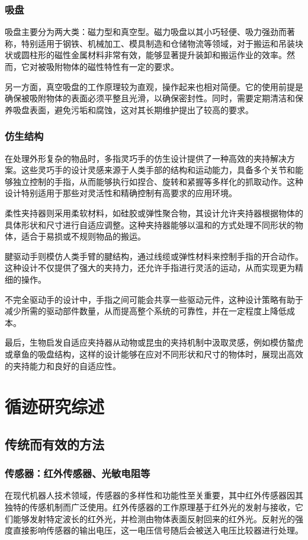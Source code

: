\documentclass{report}
\begin{document}
\newpage
\subsubsection{吸盘}
\label{subsec:label}
吸盘主要分为两大类：磁力型和真空型。磁力吸盘以其小巧轻便、吸力强劲而著称，特别适用于钢铁、机械加工、模具制造和仓储物流等领域，对于搬运和吊装块状或圆柱形的磁性金属材料非常有效，能够显著提升装卸和搬运作业的效率。然而，它对被吸附物体的磁性特性有一定的要求。

另一方面，真空吸盘的工作原理较为直观，操作起来也相对简便。它的使用前提是确保被吸附物体的表面必须平整且光滑，以确保密封性。同时，需要定期清洁和保养吸盘表面，避免污垢和腐蚀，这对其长期维护提出了较高的要求。
\subsubsection{仿生结构}
\label{subsec:label}
在处理外形复杂的物品时，多指灵巧手的仿生设计提供了一种高效的夹持解决方案。这些灵巧手的设计灵感来源于人类手部的结构和运动能力，具备多个关节和能够独立控制的手指，从而能够执行如捏合、旋转和紧握等多样化的抓取动作。这种设计特别适用于那些对灵活性和精确控制有高要求的应用环境。

柔性夹持器则采用柔软材料，如硅胶或弹性聚合物，其设计允许夹持器根据物体的具体形状和尺寸进行自适应调整。这种夹持器能够以温和的方式处理不同形状的物体，适合于易损或不规则物品的搬运。

腱驱动手则模仿人类手臂的腱结构，通过线缆或弹性材料来控制手指的开合动作。这种设计不仅提供了强大的夹持力，还允许手指进行灵活的运动，从而实现更为精细的操作。

不完全驱动手的设计中，手指之间可能会共享一些驱动元件，这种设计策略有助于减少所需的驱动部件数量，从而提高整个系统的可靠性，并在一定程度上降低成本。

最后，生物启发自适应夹持器从动物或昆虫的夹持机制中汲取灵感，例如模仿螯虎或章鱼的吸盘结构，这样的设计能够在应对不同形状和尺寸的物体时，展现出高效的夹持能力和良好的自适应性。


\newpage
\section{循迹研究综述}
\subsection{传统而有效的方法\cite{intro2023robot}}
\label{subsec:label}
\subsubsection{传感器：红外传感器、光敏电阻等}
\label{subsec:label}
在现代机器人技术领域，传感器的多样性和功能性至关重要，其中红外传感器因其独特的传感机制而广泛使用。红外传感器的工作原理基于红外光的发射与接收，它们能够发射特定波长的红外光，并检测由物体表面反射回来的红外光。反射光的强度直接影响传感器的输出电压，这一电压信号随后会被送入电压比较器进行处理。
\end{document}
